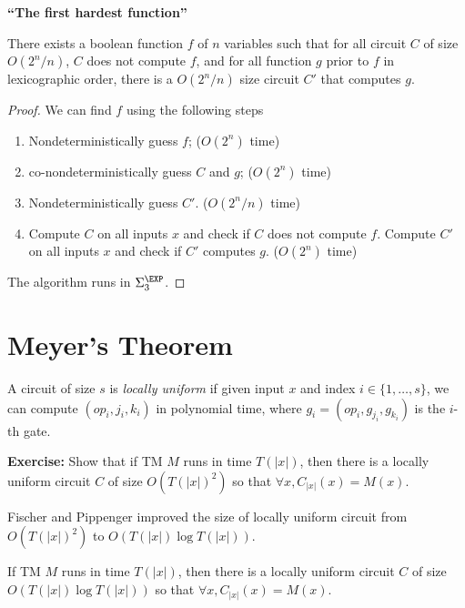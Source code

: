 \documentclass[letterpaper, 12pt]{article}
\begin{document}
\noindent \textbf{``The first hardest function''}

\begin{lemma}
There exists a boolean function $f$ of $n$ variables such that for all circuit $C$ of size $O(2^n / n)$, $C$ does not compute $f$, and for all function $g$ prior to $f$ in lexicographic order, there is a $O(2^n / n)$ size circuit $C'$ that computes $g$.
\end{lemma}

\begin{proof}
	We can find $f$ using the following steps
	\begin{enumerate}
	\item Nondeterministically guess $f$; ($O(2^n)$ time)
	\item co-nondeterministically guess $C$ and $g$; ($O(2^n)$ time)
	\item Nondeterministically guess $C'$.  ($O(2^n/n)$ time)
	\item Compute $C$ on all inputs $x$ and check if $C$ does not compute $f$. Compute $C'$ on all inputs $x$ and check if $C'$ computes $g$. ($O(2^n)$ time)
	\end{enumerate}
	The algorithm runs in $\Sigma_3^\EXP$.
	
\end{proof}

\section{Meyer's Theorem}

\begin{definition}
	A circuit of size $s$ is \emph{locally uniform} if given input $x$ and index $i \in \{1, \dots, s\}$, we can compute $(op_i, j_i, k_i)$ in polynomial time, where $g_i = (op_i, g_{j_i}, g_{k_i})$ is the $i$-th gate.
\end{definition}

\noindent \textbf{Exercise:} Show that if TM $M$ runs in time $T(|x|)$, then there is a locally uniform circuit $C$ of size $O(T(|x|)^2)$ so that $\forall x, C_{|x|}(x) = M(x)$.

Fischer and Pippenger improved the size of locally uniform circuit from $O(T(|x|)^2)$ to $O(T(|x|) \log T(|x|))$.

\begin{theorem}
If TM $M$ runs in time $T(|x|)$, then there is a locally uniform circuit $C$ of size $O(T(|x|) \log T(|x|))$ so that $\forall x, C_{|x|}(x) = M(x)$.
\end{theorem}
\end{document}
